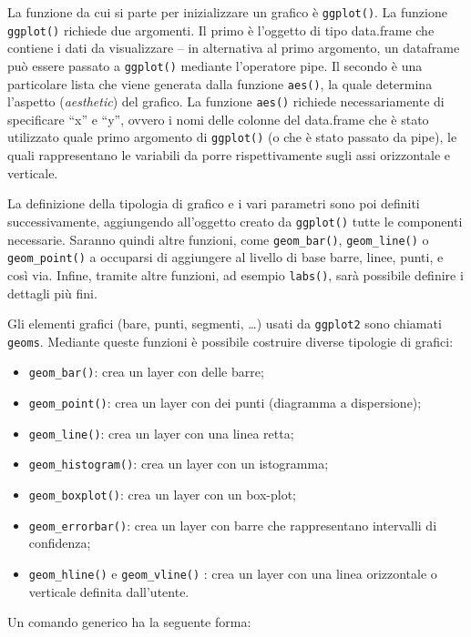 \documentclass[
  10pt,
  italian,
  a4paper,
  extrafontsizes,onecolumn,openright
  ]{memoir}
\begin{document}
La funzione da cui si parte per inizializzare un grafico è \texttt{ggplot()}. La funzione \texttt{ggplot()} richiede due argomenti. Il primo è l'oggetto di tipo data.frame che contiene i dati da visualizzare -- in alternativa al primo argomento, un dataframe può essere passato a \texttt{ggplot()} mediante l'operatore pipe. Il secondo è una particolare lista che viene generata dalla funzione \texttt{aes()}, la quale determina l'aspetto (\emph{aesthetic}) del grafico. La funzione \texttt{aes()} richiede necessariamente di specificare ``x'' e ``y'', ovvero i nomi delle colonne del data.frame che è stato utilizzato quale primo argomento di \texttt{ggplot()} (o che è stato passato da pipe), le quali rappresentano le variabili da porre rispettivamente sugli assi orizzontale e verticale.

La definizione della tipologia di grafico e i vari parametri sono poi definiti successivamente, aggiungendo all'oggetto creato da \texttt{ggplot()} tutte le componenti necessarie. Saranno quindi altre funzioni, come \texttt{geom\_bar()}, \texttt{geom\_line()} o \texttt{geom\_point()} a occuparsi di aggiungere al livello di base barre, linee, punti, e così via. Infine, tramite altre funzioni, ad esempio \texttt{labs()}, sarà possibile definire i dettagli più fini.

Gli elementi grafici (bare, punti, segmenti, \ldots) usati da \texttt{ggplot2} sono chiamati \texttt{geoms}. Mediante queste funzioni è possibile costruire diverse tipologie di grafici:

\begin{itemize}
\item
  \texttt{geom\_bar()}: crea un layer con delle barre;
\item
  \texttt{geom\_point()}: crea un layer con dei punti (diagramma a dispersione);
\item
  \texttt{geom\_line()}: crea un layer con una linea retta;
\item
  \texttt{geom\_histogram()}: crea un layer con un istogramma;
\item
  \texttt{geom\_boxplot()}: crea un layer con un box-plot;
\item
  \texttt{geom\_errorbar()}: crea un layer con barre che rappresentano intervalli di confidenza;
\item
  \texttt{geom\_hline()} e \texttt{geom\_vline()} : crea un layer con una linea orizzontale o verticale definita dall'utente.
\end{itemize}

Un comando generico ha la seguente forma:
\end{document}

